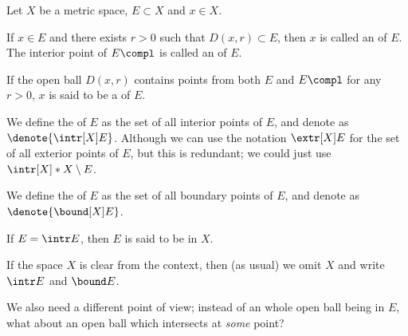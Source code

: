 \begin{definition}
    \label{def:mopen}
    Let \(X\) be a metric space,
    \(E\subset X\) and \(x\in X\).
    \begin{nlist}
        \item If \(x\in E\)
        and there exists \(r>0\) such that \(D(x,r)\subset E\),
        then \(x\) is called
        an  of \(E\).
        The interior point of \(E\compl\) is called
        an  of \(E\).
        
        \item If the open ball \(D(x,r)\) contains points from
        both \(E\) and \(E\compl\) for any \(r>0\),
        \(x\) is said to be
        a  of \(E\).

        \item We define the  of \(E\)
        as the set of all interior points of \(E\),
        and denote as \(\denote{\intr[X]E}\).
        Although we can use the notation \(\extr[X]E\)
        for the set of all exterior points of \(E\),
        but this is redundant;
        we could just use \(\intr[X]*{X\setminus E}\).

        \item We define the  of \(E\)
        as the set of all boundary points of \(E\),
        and denote as \(\denote{\bound[X]E}\).

        \item If \(E=\intr E\),
        then \(E\) is said to be  in \(X\).
    \end{nlist}
\end{definition}

If the space \(X\) is clear from the context,
then (as usual) we omit \(X\) and write \(\intr E\) and \(\bound E\).

We also need a different point of view;
instead of an whole open ball being in \(E\),
what about an open ball which intersects at \emph{some} point?

